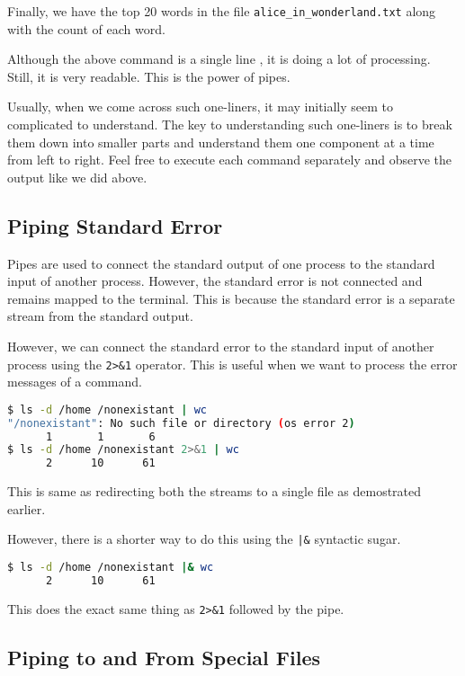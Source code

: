 Finally, we have the top 20 words in the file \texttt{alice\_in\_wonderland.txt}
along with the count of each word.

Although the above command is a single line
, it is doing a lot of
processing. Still, it is very readable. This is the power of pipes.

\begin{remark}
  Usually, when we come across such one-liners, it may initially
  seem to complicated to understand. The key to understanding such
  one-liners is to break them down into smaller parts and understand
  them one component at a time from left to right. Feel free to
  execute each command separately and observe the output like we
  did above.
\end{remark}

\subsection{Piping Standard Error}

Pipes are used to connect the standard output of one process to the
standard input of another process. However, the standard error is not
connected and remains mapped to the terminal. This is because the
standard error is a separate stream from the standard output.

However, we can connect the standard error to the standard input of
another process using the \texttt{2>\&1} operator. This is useful when
we want to process the error messages of a command.

\begin{lstlisting}[language=bash]
$ ls -d /home /nonexistant | wc
"/nonexistant": No such file or directory (os error 2)
      1       1       6
$ ls -d /home /nonexistant 2>&1 | wc
      2      10      61
\end{lstlisting}

This is same as redirecting both the streams to a single file as
demostrated earlier.

However, there is a shorter way to do this using the \texttt{|\&}
syntactic sugar.

\begin{lstlisting}[language=bash]
$ ls -d /home /nonexistant |& wc
      2      10      61
\end{lstlisting}

This does the exact same thing as \texttt{2>\&1} followed by the pipe.

\subsection{Piping to and From Special Files}

